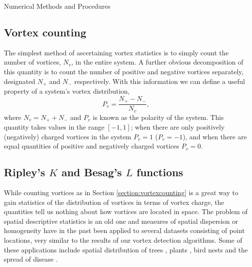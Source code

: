 \begin{chapter}{\label{cha:numerics}Numerical Methods and Procedures}
  \subsection{\label{section:vortexcounting} Vortex counting}
  The simplest method of ascertaining vortex statistics is to simply count the number of vortices, $N_v$, in the entire system. A further obvious decomposition of this quantity is to count the number of positive and negative vortices separately, designated $N_+$ and $N_-$ respectively. With this information we can define a useful property of a system's vortex distribution,
  \begin{equation}
    P_v = \frac{N_+ - N_-}{N_v},
  \end{equation}
  where $N_v = N_+ + N_-$ and $P_v$ is known as the polarity of the system. This quantity takes values in the range $[-1,1]$; when there are only positively (negatively) charged vortices in the system $P_v=1$ ($P_v=-1$), and when there are equal quantities of positive and negatively charged vortices $P_v=0$.
  \subsection{\label{section:ripleysk} Ripley's $K$ and Besag's $L$ functions }
  While counting vortices as in Section \ref{section:vortexcounting} is a great way to gain statistics of the distribution of vortices in terms of vortex charge, the quantities tell us nothing about how vortices are located in space. The problem of spatial descriptive statistics is an old one and measures of spatial dispersion or homogeneity have in the past been applied to several datasets consisting of point locations, very similar to the results of our vortex detection algorithms. Some of these applications include spatial distribution of trees \cite{duncan_1993,peterson_1995,stoyan_2000}, plants \cite{stamp_1990}, bird nests \cite{gaines_2000} and the spread of disease \cite{diggle_1991}.



\end{chapter}
